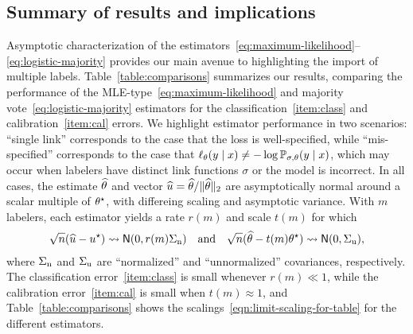 \subsection{Summary of results and implications}

Asymptotic characterization of the
estimators~\eqref{eq:maximum-likelihood}--\eqref{eq:logistic-majority}
provides our main avenue to highlighting the import of multiple labels.
%
Table~\ref{table:comparisons}  summarizes our results, comparing
the performance of the MLE-type~\eqref{eq:maximum-likelihood} and
majority vote~\eqref{eq:logistic-majority} estimators for the
classification~\ref{item:class} and calibration~\ref{item:cal} errors.
%
We highlight estimator performance in two scenarios:
``single link'' corresponds to the case that the loss is
well-specified, while ``mis-specified''
corresponds to the case that $\ell_\theta(y \mid x) \neq -\log
\mathbb{P}_{\sigma,\theta}(y \mid x)$, which may occur when labelers have
distinct link functions $\sigma$ or the model is incorrect.
%
In all cases, the
estimate $\widehat{\theta}$ and
vector $\widehat{u} = \widehat{\theta} / \|{\widehat{\theta}}\|_2$
are asymptotically normal around a scalar multiple of $\theta^\star$,
with differeing scaling and asymptotic variance.
%
With $m$ labelers,
each estimator yields a rate $r(m)$ and scale $t(m)$ for which
\begin{align}
  \label{eqn:limit-scaling-for-table}
  \sqrt{n}(\widehat{u} - u^\star)
  \rightsquigarrow \mathsf{N}(0, r(m) \Sigma_{\textup{n}})
  ~~~ \mbox{and} ~~~
  \sqrt{n}(\widehat{\theta} - t(m) \theta^\star)
  \rightsquigarrow \mathsf{N}(0, \Sigma_{\textup{u}}),
\end{align}
where $\Sigma_{\textup{n}}$ and $\Sigma_{\textup{u}}$ are ``normalized'' and
``unnormalized'' covariances, respectively.
%
The classification error~\ref{item:class} is small whenever $r(m) \ll 1$,
while the calibration error~\ref{item:cal} is small when $t(m) \approx 1$,
and Table~\ref{table:comparisons} shows the
scalings~\eqref{eqn:limit-scaling-for-table} for the different estimators.

